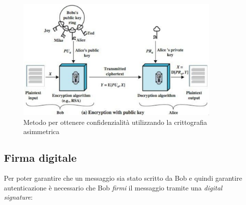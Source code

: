\begin{figure}[H]
    \centering
    \includegraphics[width=0.9\textwidth]{images/confidentiality.png}
    \caption{Metodo per ottenere confidenzialità utilizzando la crittografia asimmetrica}
\end{figure}

\subsection{Firma digitale}
Per poter garantire che un messaggio sia stato scritto da Bob e quindi garantire autenticazione è necessario che Bob \textit{firmi} il messaggio tramite una \textit{digital signature}:

